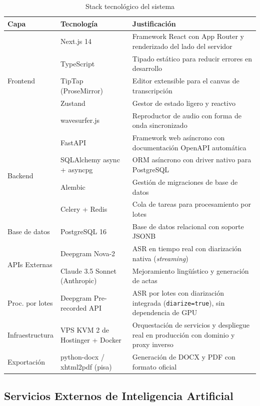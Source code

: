 \documentclass[12pt,a4paper,oneside]{report}
\begin{document}
\begin{table}[H]
\centering
\small
\caption{Stack tecnológico del sistema}
\begin{tabular}{|p{2.2cm}|p{3.2cm}|p{7cm}|}
\hline
\rowcolor{gray!20}
\textbf{Capa} & \textbf{Tecnología} & \textbf{Justificación} \\
\hline
\multirow{5}{2.2cm}{Frontend} & Next.js 14 & Framework React con App Router y renderizado del lado del servidor \\
\cline{2-3}
& TypeScript & Tipado estático para reducir errores en desarrollo \\
\cline{2-3}
& TipTap (ProseMirror) & Editor extensible para el canvas de transcripción \\
\cline{2-3}
& Zustand & Gestor de estado ligero y reactivo \\
\cline{2-3}
& wavesurfer.js & Reproductor de audio con forma de onda sincronizado \\
\hline
\multirow{4}{2.2cm}{Backend} & FastAPI & Framework web asíncrono con documentación OpenAPI automática \\
\cline{2-3}
& SQLAlchemy async + asyncpg & ORM asíncrono con driver nativo para PostgreSQL \\
\cline{2-3}
& Alembic & Gestión de migraciones de base de datos \\
\cline{2-3}
& Celery + Redis & Cola de tareas para procesamiento por lotes \\
\hline
Base de datos & PostgreSQL 16 & Base de datos relacional con soporte JSONB \\
\hline
\multirow{2}{2.2cm}{APIs Externas} & Deepgram Nova-2 & ASR en tiempo real con diarización nativa (\textit{streaming}) \\
\cline{2-3}
& Claude 3.5 Sonnet (Anthropic) & Mejoramiento lingüístico y generación de actas \\
\hline
Proc. por lotes & Deepgram Pre-recorded API & ASR por lotes con diarización integrada (\texttt{diarize=true}), sin dependencia de GPU \\
\hline
Infraestructura & VPS KVM 2 de Hostinger + Docker & Orquestación de servicios y despliegue real en producción con dominio y proxy inverso \\
\hline
Exportación & python-docx / xhtml2pdf (pisa) & Generación de DOCX y PDF con formato oficial \\
\hline
\end{tabular}
\label{tab:stack}
\end{table}

\subsection{Servicios Externos de Inteligencia Artificial}
\end{document}

